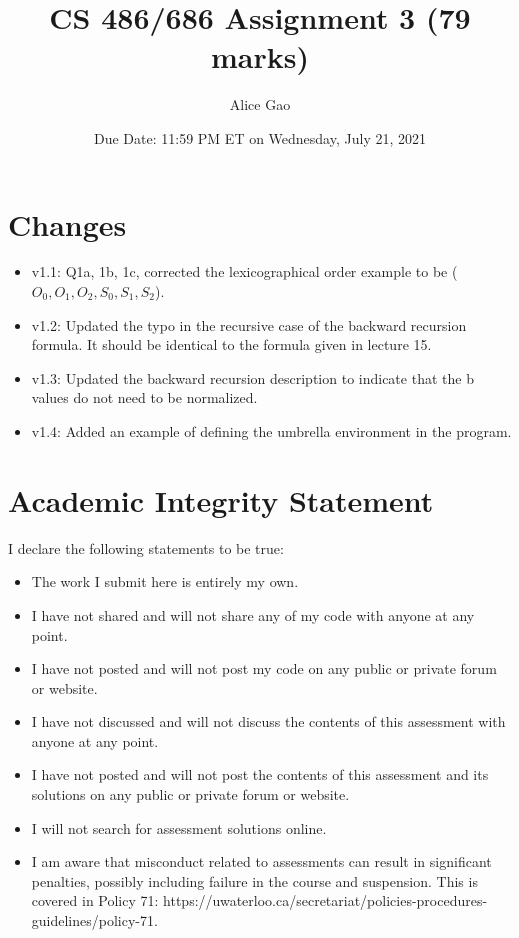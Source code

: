 \documentclass[12pt]{article}
\title{CS 486/686 Assignment 3 (79 marks)}
\author{Alice Gao}
\date{Due Date: 11:59 PM ET on Wednesday, July 21, 2021}
\begin{document}
\maketitle

\section*{Changes}

\begin{itemize}
\item 
v1.1: Q1a, 1b, 1c, corrected the lexicographical order example to be ($O_0, O_1, O_2, S_0, S_1, S_2$).
\item 
v1.2: Updated the typo in the recursive case of the backward recursion formula. It should be identical to the formula given in lecture 15.
\item 
v1.3: Updated the backward recursion description to indicate that the b values do not need to be normalized.
\item 
v1.4: Added an example of defining the umbrella environment in the program.
\end{itemize}
\newpage

\section*{Academic Integrity Statement}

I declare the following statements to be true:

\begin{itemize}
\item 
The work I submit here is entirely my own.

\item 	
I have not shared and will not share any of my code with anyone at any point. 

\item 
I have not posted and will not post my code on any public or private forum or website.

\item 	
I have not discussed and will not discuss the contents of this assessment with anyone at any point.

\item 
I have not posted and will not post the contents of this assessment and its solutions on any public or private forum or website. 

\item 
I will not search for assessment solutions online.

\item 
I am aware that misconduct related to assessments can result in significant penalties, possibly including failure in the course and suspension. This is covered in Policy 71: https://uwaterloo.ca/secretariat/policies-procedures-guidelines/policy-71.
\end{itemize}
\end{document}
